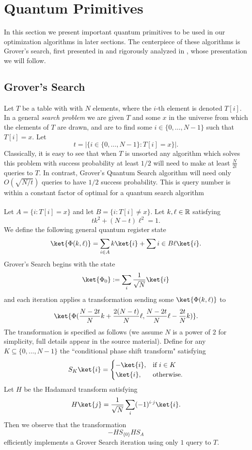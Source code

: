 \section{Quantum Primitives}\label{sec:quantum-primitives}
\paragraph{}
In this section we present important quantum primitives to be used in our optimization algorithms in later sections. The centerpiece of these algorithms is Grover's search, first presented in \cite{grover1996fast} and rigorously analyzed in \cite{boyer1996tight}, whose presentation we will follow.
\subsection{Grover's Search}
\paragraph{}
Let $T$ be  a table with with $N$ elements, where the $i$-th element is denoted $T[i]$. In a general {\it search problem} we are given $T$ and some $x$ in the universe from which the elements of $T$ are drawn, and are to find some $i \in \{0, \dots, N-1\}$ such that $T[i] = x$. Let $$t= |\{ i \in \{0,\dots, N-1\} : T[i] = x\}|.$$ Classically, it is easy to see that when $T$ is unsorted any algorithm which solves this problem with success probability at least $1/2$ will need to make at least $\frac{N}{2t}$ queries to $T$. In contrast, Grover's Quantum Search algorithm will need only $O(\sqrt{N/t})$ queries to have $1/2$ success probability. This is query number is within a constant factor of optimal for a quantum search algorithm 
\paragraph{}
Let $A = \{ i : T[i] = x\}$ and let $B = \{ i : T[i] \neq x \}$. Let $k, \ell \in \mathbb{R}$ satisfying $$tk^2 + (N-t)\ell^2 = 1.$$ We define the following general quantum register state
$$\ket{\Phi(k,\ell)} = \sum_{i \in A} k \ket{i} + \sum{i \in B} \ell \ket{i}.$$
Grover's Search begins with the state $$\ket{\Phi_0} := \sum_i \frac{1}{\sqrt{N}} \ket{i}$$
and each iteration applies a transformation sending some $\ket{\Phi(k,\ell)}$ to
$$\ket{\Phi(\frac{N-2t}{N}k + \frac{2(N-t)}{N}\ell, \frac{N-2t}{N}\ell - \frac{2t}{N} k)}.$$
The transformation is specified as follows (we assume $N$ is a power of $2$ for simplicity, full details appear in the source material). Define for any $K \subseteq \{0, \dots, N-1\}$ the ``conditional phase shift transform" satisfying
$$S_K\ket{i} = \begin{cases}
-\ket{i}, &\text{if $i \in K$} \\
\ket{i}, &\text{otherwise}.
\end{cases}$$
Let $H$ be the Hadamard transform satisfying
$$H\ket{j} = \frac{1}{\sqrt{N}} \sum_i (-1)^{i\cdot j} \ket{i}.$$
Then we observe that the transformation
$$-HS_{\{0\}}HS_A$$
efficiently implements a Grover Search iteration using only $1$ query to $T$.
